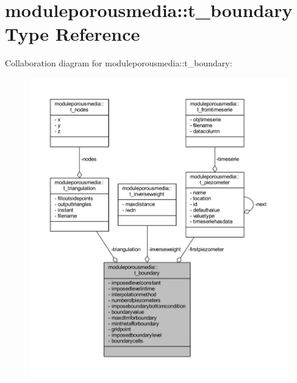 \hypertarget{structmoduleporousmedia_1_1t__boundary}{}\section{moduleporousmedia\+:\+:t\+\_\+boundary Type Reference}
\label{structmoduleporousmedia_1_1t__boundary}


Collaboration diagram for moduleporousmedia\+:\+:t\+\_\+boundary\+:\nopagebreak
\begin{figure}[H]
\begin{center}
\leavevmode
\includegraphics[width=350pt]{structmoduleporousmedia_1_1t__boundary__coll__graph}
\end{center}
\end{figure}
